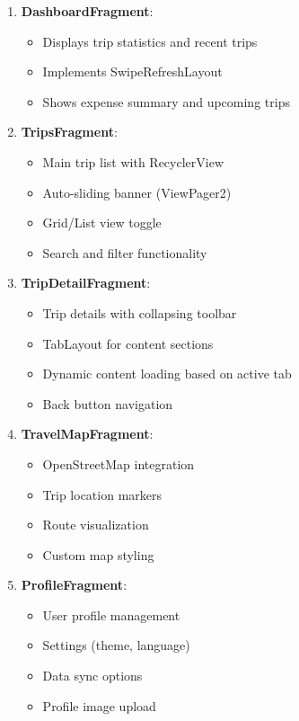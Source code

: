 \documentclass[12pt,a4paper]{article}
\begin{document}
\begin{enumerate}
    \item \textbf{DashboardFragment}:
    \begin{itemize}
        \item Displays trip statistics and recent trips
        \item Implements SwipeRefreshLayout
        \item Shows expense summary and upcoming trips
    \end{itemize}

    \item \textbf{TripsFragment}:
    \begin{itemize}
        \item Main trip list with RecyclerView
        \item Auto-sliding banner (ViewPager2)
        \item Grid/List view toggle
        \item Search and filter functionality
    \end{itemize}

    \item \textbf{TripDetailFragment}:
    \begin{itemize}
        \item Trip details with collapsing toolbar
        \item TabLayout for content sections
        \item Dynamic content loading based on active tab
        \item Back button navigation
    \end{itemize}

    \item \textbf{TravelMapFragment}:
    \begin{itemize}
        \item OpenStreetMap integration
        \item Trip location markers
        \item Route visualization
        \item Custom map styling
    \end{itemize}

    \item \textbf{ProfileFragment}:
    \begin{itemize}
        \item User profile management
        \item Settings (theme, language)
        \item Data sync options
        \item Profile image upload
    \end{itemize}


\end{enumerate}
\end{document}

